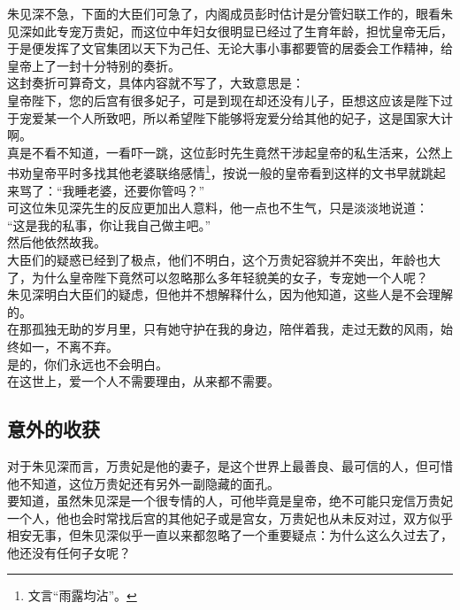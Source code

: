 \begin{multicols}{\theparacolNo}
朱见深不急，下面的大臣们可急了，内阁成员彭时估计是分管妇联工作的，眼看朱见深如此专宠万贵妃，而这位中年妇女很明显已经过了生育年龄，担忧皇帝无后，于是便发挥了文官集团以天下为己任、无论大事小事都要管的居委会工作精神，给皇帝上了一封十分特别的奏折。\\

这封奏折可算奇文，具体内容就不写了，大致意思是：\\

皇帝陛下，您的后宫有很多妃子，可是到现在却还没有儿子，臣想这应该是陛下过于宠爱某一个人所致吧，所以希望陛下能够将宠爱分给其他的妃子，这是国家大计啊。\\

真是不看不知道，一看吓一跳，这位彭时先生竟然干涉起皇帝的私生活来，公然上书劝皇帝平时多找其他老婆联络感情\footnote{文言“雨露均沾”。}，按说一般的皇帝看到这样的文书早就跳起来骂了：“我睡老婆，还要你管吗？”\\

可这位朱见深先生的反应更加出人意料，他一点也不生气，只是淡淡地说道：\\

“这是我的私事，你让我自己做主吧。”\\

然后他依然故我。\\

大臣们的疑惑已经到了极点，他们不明白，这个万贵妃容貌并不突出，年龄也大了，为什么皇帝陛下竟然可以忽略那么多年轻貌美的女子，专宠她一个人呢？\\

朱见深明白大臣们的疑虑，但他并不想解释什么，因为他知道，这些人是不会理解的。\\

在那孤独无助的岁月里，只有她守护在我的身边，陪伴着我，走过无数的风雨，始终如一，不离不弃。\\

是的，你们永远也不会明白。\\

在这世上，爱一个人不需要理由，从来都不需要。\\

\subsection{意外的收获}
对于朱见深而言，万贵妃是他的妻子，是这个世界上最善良、最可信的人，但可惜他不知道，这位万贵妃还有另外一副隐藏的面孔。\\

要知道，虽然朱见深是一个很专情的人，可他毕竟是皇帝，绝不可能只宠信万贵妃一个人，他也会时常找后宫的其他妃子或是宫女，万贵妃也从未反对过，双方似乎相安无事，但朱见深似乎一直以来都忽略了一个重要疑点：为什么这么久过去了，他还没有任何子女呢？\\


\end{multicols}
